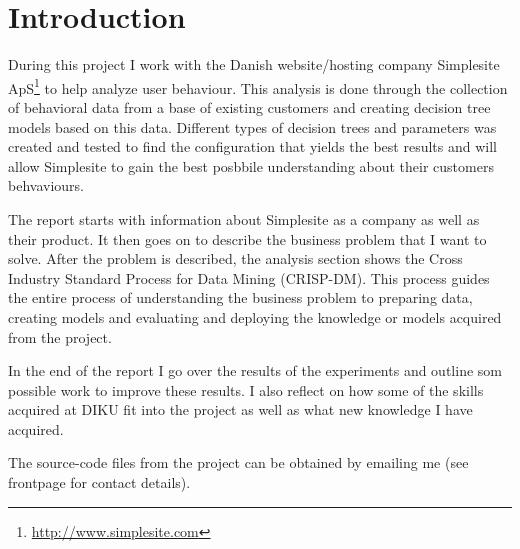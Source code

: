 \section{Introduction}

During this project I work with the Danish website/hosting company Simplesite
ApS\footnote{\url{http://www.simplesite.com}} to help analyze user behaviour.
This analysis is done through the collection of behavioral data from a base of
existing customers and creating decision tree models based on this data.
Different types of decision trees and parameters was created and tested to find
the configuration that yields the best results and will allow Simplesite to gain
the best posbbile understanding about their customers behvaviours.

The report starts with information about Simplesite as a company as well as
their product. It then goes on to describe the business problem that I want to
solve. After the problem is described, the analysis section shows the Cross
Industry Standard Process for Data Mining\cite{shearer2000crisp} (CRISP-DM).
This process guides the entire process of understanding the business problem to
preparing data, creating models and evaluating and deploying the knowledge or
models acquired from the project.

In the end of the report I go over the results of the experiments and outline
som possible work to improve these results. I also reflect on how some of the
skills acquired at DIKU fit into the project as well as what new knowledge I
have acquired.

The source-code files from the project can be obtained by emailing me (see
frontpage for contact details).
